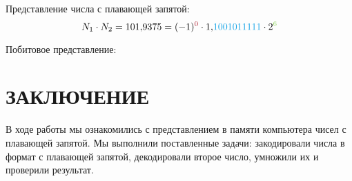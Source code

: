 \documentclass[14pt]{extarticle}
\newcommand\fp[3]{\begin{center}\vspace{-1.0em}\texttt{
        {\color{Maroon}{#1}}
        {\color{ForestGreen}{#2}}
        {\color{Cerulean}{#3}}
    }\end{center}\vspace{-0.5em}}
\begin{document}
Представление числа с плавающей запятой:
$$N_1 \cdot N_2
= 101{,}9375
= (-1)^{{\color{Maroon} 0}}
\cdot 1{,}{\color{Cerulean} 1001011111}
\cdot 2^{{\color{YellowGreen} 6}}$$

Побитовое представление:

\answer{3b}{\fp{0}{10000101}{10010111110000000000000}}

\newpage

\section{\MakeUppercase{Заключение}}

В ходе работы мы ознакомились с представлением в памяти компьютера чисел с плавающей запятой. Мы выполнили поставленные задачи: закодировали числа в формат с плавающей запятой, декодировали второе число, умножили их и проверили результат.
\end{document}
